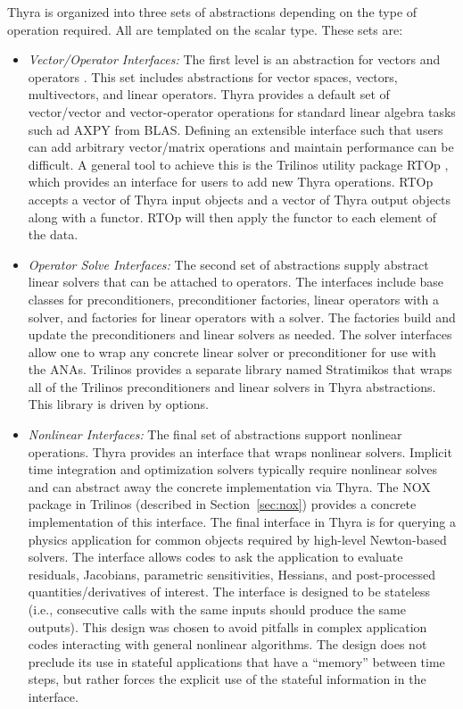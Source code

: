 Thyra is organized into three sets of abstractions depending on the type of operation required. All are templated on the scalar type. These sets are:
\begin{itemize}
\item \emph{Vector/Operator Interfaces:} The first level is an abstraction for vectors and operators \cite{Bartlett2007}. This set includes abstractions for vector spaces, vectors, multivectors, and linear operators. Thyra provides a default set of vector/vector and vector-operator operations for standard linear algebra tasks such ad AXPY from BLAS. Defining an extensible interface such that users can add arbitrary vector/matrix operations and maintain performance can be difficult. A general tool to achieve this is the Trilinos utility package RTOp \cite{rtop}, which provides an interface for users to add new Thyra operations. RTOp accepts a vector of Thyra input objects and a vector of Thyra output objects along with a functor. RTOp will then apply the functor to each element of the data.

\item \emph{Operator Solve Interfaces:} The second set of abstractions supply abstract linear solvers that can be attached to operators. The interfaces include base classes for preconditioners, preconditioner factories, linear operators with a solver, and factories for linear operators with a solver. The factories build and update the preconditioners and linear solvers as needed. The solver interfaces allow one to wrap any concrete linear solver or preconditioner for use with the ANAs. Trilinos provides a separate library named Stratimikos that wraps all of the Trilinos preconditioners and linear solvers in Thyra abstractions. This library is driven by  options.

\item \emph{Nonlinear Interfaces:} The final set of abstractions support nonlinear operations. Thyra provides an interface that wraps nonlinear solvers. Implicit time integration and optimization solvers typically require nonlinear solves and can abstract away the concrete implementation via Thyra. The NOX package in Trilinos (described in Section~\ref{sec:nox}) provides a concrete implementation of this interface. The final interface in Thyra is for querying a physics application for common objects required by high-level Newton-based solvers. The  interface allows codes to ask the application to evaluate residuals, Jacobians, parametric sensitivities, Hessians, and post-processed quantities/derivatives of interest. The interface is designed to be stateless (i.e., consecutive calls with the same inputs should produce the same outputs). This design was chosen to avoid pitfalls in complex application codes interacting with general nonlinear algorithms. The design does not preclude its use in stateful applications that have a ``memory'' between time steps, but rather forces the explicit use of the stateful information in the interface.
\end{itemize}
